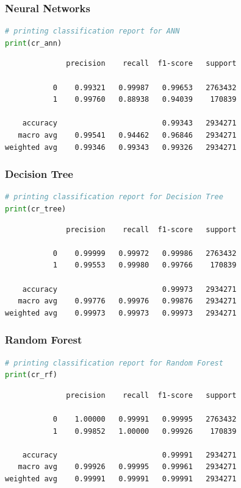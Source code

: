 \documentclass{article}
\begin{document}
\subsubsection{Neural Networks}
\begin{lstlisting}[language=Python]
# printing classification report for ANN
print(cr_ann)
\end{lstlisting}
\begin{verbatim}    
              precision    recall  f1-score   support

           0    0.99321   0.99987   0.99653   2763432
           1    0.99760   0.88938   0.94039    170839

    accuracy                        0.99343   2934271
   macro avg    0.99541   0.94462   0.96846   2934271
weighted avg    0.99346   0.99343   0.99326   2934271
\end{verbatim}

\subsubsection{Decision Tree}
\begin{lstlisting}[language=Python]
# printing classification report for Decision Tree
print(cr_tree)
\end{lstlisting}
\begin{verbatim}
              precision    recall  f1-score   support

           0    0.99999   0.99972   0.99986   2763432
           1    0.99553   0.99980   0.99766    170839

    accuracy                        0.99973   2934271
   macro avg    0.99776   0.99976   0.99876   2934271
weighted avg    0.99973   0.99973   0.99973   2934271
\end{verbatim}

\subsubsection{Random Forest}
\begin{lstlisting}[language=Python]
# printing classification report for Random Forest
print(cr_rf)
\end{lstlisting}
\begin{verbatim}   
              precision    recall  f1-score   support

           0    1.00000   0.99991   0.99995   2763432
           1    0.99852   1.00000   0.99926    170839

    accuracy                        0.99991   2934271
   macro avg    0.99926   0.99995   0.99961   2934271
weighted avg    0.99991   0.99991   0.99991   2934271

\end{verbatim}
\end{document}
